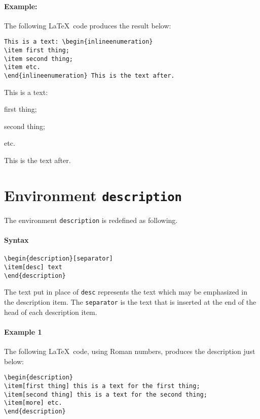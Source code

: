 \documentclass[book,taskpackage,specpackage,codepackage]{upmethodology-document}
\begin{document}
\paragraph{Example:} The following \LaTeX~code produces the result below:
\begin{verbatim}
This is a text: \begin{inlineenumeration}
\item first thing;
\item second thing;
\item etc.
\end{inlineenumeration} This is the text after.
\end{verbatim}

This is a text: \begin{inlineenumeration}
\item first thing;
\item second thing;
\item etc.
\end{inlineenumeration} This is the text after.

\section{Environment \texttt{description}}

The environment \texttt{description} is redefined as following.

\paragraph{Syntax}
\begin{verbatim}
\begin{description}[separator]
\item[desc] text
\end{description}
\end{verbatim}
The text put in place of \texttt{desc} represents the text which may be emphasized in the description item.
The \texttt{separator} is the text that is inserted at the end of the head of each description item.


\paragraph{Example 1} The following \LaTeX~code, using Roman numbers, produces the description just below:
\begin{verbatim}
\begin{description}
\item[first thing] this is a text for the first thing;
\item[second thing] this is a text for the second thing;
\item[more] etc.
\end{description}
\end{verbatim}
\end{document}
